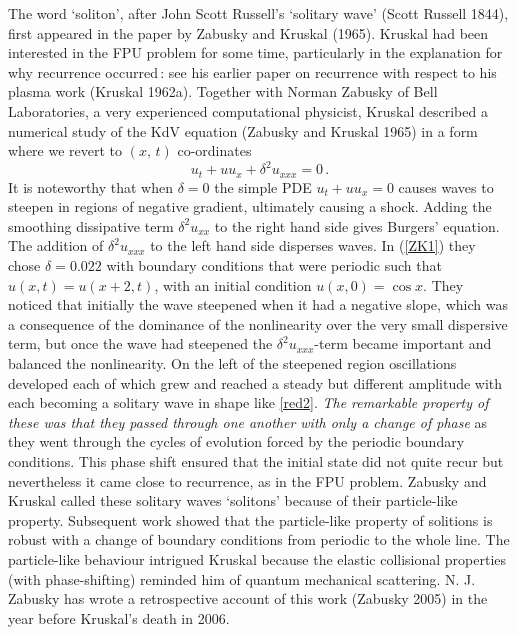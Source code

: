 \documentclass[11pt]{article}
\newcommand{\bel}{\begin{equation}\label}
\newcommand{\ee}{\end{equation}}
\begin{document}
\par\smallskip%
The word `soliton', after John Scott Russell's `solitary wave' (Scott Russell 1844), first appeared in the paper by Zabusky 
and Kruskal (1965). Kruskal had been interested in the FPU problem for some time, particularly in the explanation for why recurrence occurred\,: see his earlier paper on recurrence with respect to his plasma work (Kruskal 1962a). Together with 
Norman Zabusky of Bell Laboratories, a very experienced computational physicist, Kruskal described a numerical study of the 
KdV equation (Zabusky and Kruskal 1965) in a form where we revert to $(x,\,t)$ co-ordinates
\bel{ZK1}
u_{t} + uu_{x} + \delta^{2}u_{xxx} = 0\,.
\ee
It is noteworthy that when $\delta = 0$ the simple PDE $u_{t} + uu_{x} = 0$ causes waves to steepen in regions of negative gradient, ultimately causing a shock. Adding the smoothing dissipative term $\delta^{2}u_{xx}$ to the right hand side gives Burgers' equation. The addition of $\delta^{2}u_{xxx}$ to the left hand side disperses waves. In (\ref{ZK1}) they chose 
$\delta = 0.022$ with boundary conditions that were periodic such that $u(x,t) = u(x+2,t)$, with an initial condition $u(x,0) 
= \cos x$. They noticed that initially the wave steepened when it had a negative slope, which was a consequence of the dominance of the nonlinearity over the very small dispersive term, but once the wave had steepened the $\delta^{2}u_{xxx}$-term became important and balanced the nonlinearity. On the left of the steepened region oscillations developed each of which grew and reached a steady but different amplitude with each becoming a solitary wave in shape like \eqref{red2}. \textit{The remarkable property of these was that they passed through one another with only a change of phase} as they went through the cycles of evolution forced by the periodic boundary conditions. This phase shift ensured that the initial state did not quite recur but nevertheless it came close to recurrence, as in the FPU problem. Zabusky and Kruskal called these solitary waves `solitons' because of their particle-like property. Subsequent work showed that the particle-like property of solitions is robust with a change of boundary conditions from periodic to the whole line. The particle-like behaviour intrigued Kruskal because the elastic collisional properties (with phase-shifting) reminded him of quantum mechanical scattering. N. J. Zabusky has wrote a retrospective account of this work (Zabusky 2005) in the year before Kruskal's death in 2006. 

\end{document}
